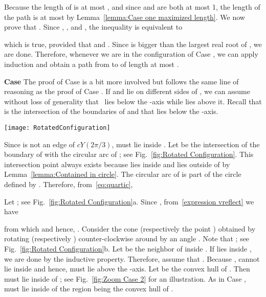 \documentclass{cccg14}
\newcommand{\cyaoOneTwenty}{\ensuremath{cY(2\pi/3)}\xspace}
\begin{document}
Because the length of  is at most , and since  and  are both at most 1,
the length of the path  is at most 
by Lemma~\ref{lemma:Case one maximized length}. 
We now prove that .
Since , , 
and ,
 the inequality  is equivalent to 
  \vspace{-.1in}
 
which is true,
provided that
 and .
Since  is bigger than the largest real root of ,
we are done.
Therefore,
whenever we are in the configuration of Case ,
we can apply induction and obtain a path  from  to  of length at most .\vspace{.05in}

\textbf{Case } The proof of Case  is a bit more involved but follows the same line of reasoning as the proof of Case .
If  and  lie on different sides of , we can assume without loss of generality that~ lies below the -axis while  lies above it.
Recall that  is the intersection of the boundaries of  and  that lies below the -axis.

\begin{figure*}[htb]
\centering
\texttt{[image: RotatedConfiguration]}
\vspace{-0.5em}
\caption{\small a) Point  and angle  b) Cone  is obtained by rotating  counter-clockwise  degrees.}
\vspace{-0.5em}
\label{fig:Rotated Configuration}
\end{figure*}

Since  is not an edge of \cyaoOneTwenty,
 must lie inside .
Let  be the intersection of the boundary of  with the circular arc of ; see Fig.~\ref{fig:Rotated Configuration}.
This intersection point always exists because
 lies inside 
and  lies outside of  by Lemma~\ref{lemma:Contained in circle}.
The circular arc of  is part of the circle defined by .
Therefore,
from~\eqref{eq:quartic},
 \vspace{-.07in}



Let ; see Fig.~\ref{fig:Rotated Configuration}a.
Since ,
from~\eqref{expression vreflect}
we have \vspace{-.09in}

from which  and hence, .
Consider the cone 
(respectively the point )
obtained by rotating 
(respectively )
counter-clockwise around  by an angle .
Note that ; see Fig.~\ref{fig:Rotated Configuration}b.
Let  be the neighbor of  inside . 
If  lies inside , we are done by the inductive property.
Therefore, assume that .
Because ,  cannot lie inside  and hence,
 must lie above the -axis. 
Let  be the convex hull of . Then  
must lie inside of ; see Fig.~\ref{fig:Zoom Case 2} for an illustration.
As in Case ,  must lie inside of the region  being the convex hull of .
\end{document}
